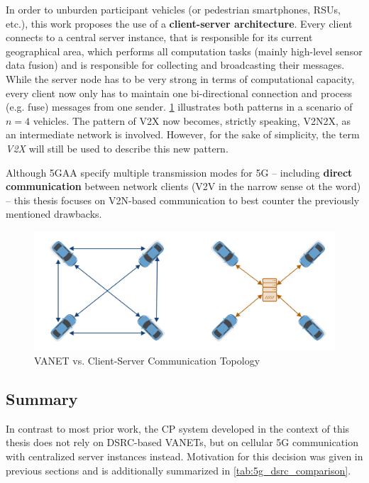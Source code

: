In order to unburden participant vehicles (or pedestrian smartphones, RSUs, etc.), this work proposes the use of a \textbf{client-server architecture}. Every client connects to a central server instance, that is responsible for its current geographical area, which performs all computation tasks (mainly high-level sensor data fusion) and is responsible for collecting and broadcasting their messages. While the server node has to be very strong in terms of computational capacity, every client now only has to maintain one bi-directional connection and process (e.g. fuse) messages from one sender. \cref{fig:communication_topology} illustrates both patterns in a scenario of $n = 4$ vehicles. The pattern of V2X now becomes, strictly speaking, V2N2X, as an intermediate network is involved. However, for the sake of simplicity, the term \textit{V2X} will still be used to describe this new pattern. 

Although 5GAA specify multiple transmission modes for 5G \cite{5GAutomotiveAssociation2016} – including \textbf{direct communication} between network clients (V2V in the narrow sense ot the word) – this thesis focuses on V2N-based communication to best counter the previously mentioned drawbacks. 

\begin{figure}[h]
	\centering
	\includegraphics[width=0.9\linewidth]{98_images/topology_comparison}
	\caption{VANET vs. Client-Server Communication Topology}
	\label{fig:communication_topology}
\end{figure}


\subsection{Summary}
\label{subsec:concept_design:5g:summary}
In contrast to most prior work, the CP system developed in the context of this thesis does not rely on DSRC-based VANETs, but on cellular 5G communication with centralized server instances instead. Motivation for this decision was given in previous sections and is additionally summarized in \cref{tab:5g_dsrc_comparison}.

